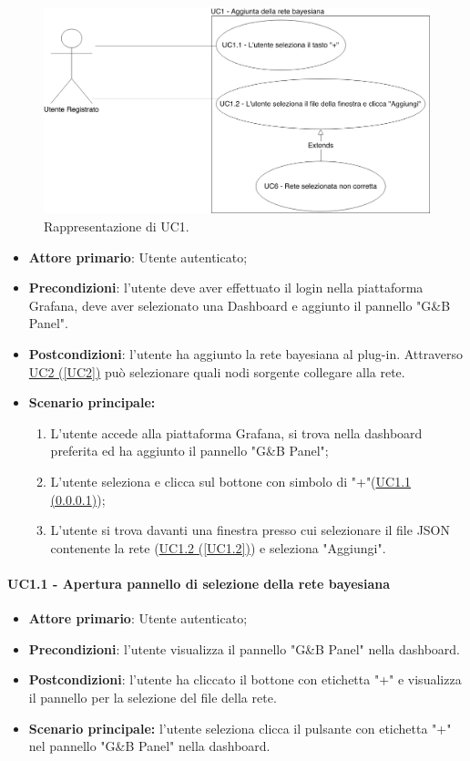 \begin{figure}[H]
	\begin{center}
		\includegraphics[scale=0.3]{./images/UC1.png}
		 \caption{Rappresentazione di UC1.}	
	\end{center}
\end{figure}
\begin{itemize}
	\item \textbf{Attore primario}: Utente autenticato;
	\item \textbf{Precondizioni}: l'utente deve aver effettuato il login nella piattaforma Grafana, deve aver selezionato una Dashboard e aggiunto il pannello "G\&B Panel".
	\item \textbf{Postcondizioni}: l'utente ha aggiunto la rete bayesiana al plug-in. Attraverso \hyperref[UC2]{UC2 (\ref*{UC2})} può selezionare quali nodi sorgente collegare alla rete.
	\item \textbf{Scenario principale:}
	\begin{enumerate}
		\item L'utente accede alla piattaforma Grafana, si trova nella dashboard preferita ed ha aggiunto il pannello "G\&B Panel";
		\item L'utente seleziona e clicca sul bottone con simbolo di "+"(\hyperref[UC1.1]{UC1.1 (\ref*{UC1.1})});
		\item L'utente si trova davanti una finestra presso cui selezionare il file JSON contenente la rete (\hyperref[UC1.2]{UC1.2 (\ref*{UC1.2})}) e seleziona "Aggiungi".
	\end{enumerate}
\end{itemize}

\paragraph{UC1.1 - Apertura pannello di selezione della rete bayesiana}\label{UC1.1}
\begin{itemize}
	\item \textbf{Attore primario}: Utente autenticato; 
	\item \textbf{Precondizioni}: l'utente visualizza il pannello "G\&B Panel" nella dashboard.
	\item \textbf{Postcondizioni}: l'utente ha cliccato il bottone con etichetta "+" e visualizza il pannello per la selezione del file della rete.
	\item \textbf{Scenario principale:} l'utente seleziona clicca il pulsante con etichetta "+" nel pannello "G\&B Panel" nella dashboard.
\end{itemize}


